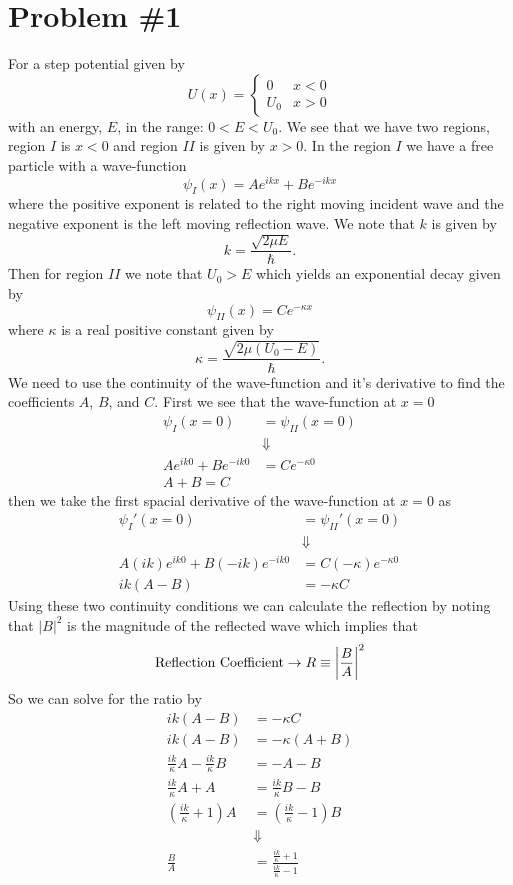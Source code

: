 \documentclass[11pt]{article}
\numberwithin{equation}{section}
\begin{document}


\section{Problem \#1}
For a step potential given by
$$U(x) = \left\{\begin{array}{cl}
                  0      &x<0\\
                  U_0    &x>0
         \end{array}\right.$$
with an energy, $E$, in the range: $0<E<U_0$. We see that we have two regions, region $I$ is
$x<0$ and region $II$ is given by $x>0$. In the region $I$ we have a free particle with a 
wave-function 
$$\psi_I(x) = Ae^{ikx} + Be^{-ikx}$$
where the positive exponent is related to the right moving incident wave and the negative 
exponent is the left moving reflection wave. We note that $k$ is given by
$$k = \frac{\sqrt{2\mu E}}{\hbar}.$$
Then for region $II$ we note that $U_0>E$ which
yields an exponential decay given by
$$\psi_{II}(x) = Ce^{-\kappa x}$$
where $\kappa$ is a real positive constant given by
$$\kappa = \frac{\sqrt{2\mu(U_0-E)}}{\hbar}.$$
We need to use the continuity of the wave-function and it's derivative to find the 
coefficients $A$, $B$, and $C$. First we see that the wave-function at $x=0$ 
\begin{align*}
\psi_I(x=0) &= \psi_{II}(x=0)\\
&\Downarrow\\
Ae^{ik0} + Be^{-ik0} &= Ce^{-\kappa 0}\\
A + B = C
\end{align*}
then we take the first spacial derivative of the wave-function at $x=0$ as
\begin{align*}
\psi_I'(x=0) &= \psi_{II}'(x=0)\\
&\Downarrow\\
A(ik)e^{ik0} + B(-ik)e^{-ik0} &= C(-\kappa)e^{-\kappa 0}\\
ik(A - B) &= -\kappa C
\end{align*}
Using these two continuity conditions we can calculate the reflection by noting that $|B|^2$
is the magnitude of the reflected wave which implies that
$$\textnormal{Reflection Coefficient}\rightarrow R\equiv\left|\frac{B}{A}\right|^2$$
So we can solve for the ratio by
\begin{align*}
ik(A - B) &= -\kappa C\\
ik(A - B) &= -\kappa (A+B)\\
\frac{ik}{\kappa}A - \frac{ik}{\kappa}B &= -A - B\\
\frac{ik}{\kappa}A  + A &= \frac{ik}{\kappa}B- B\\
\left(\frac{ik}{\kappa}+1\right)A&= \left(\frac{ik}{\kappa}-1\right) B\\
&\Downarrow\\
\frac{B}{A} &= \frac{\frac{ik}{\kappa}+1}{\frac{ik}{\kappa}-1}
\end{align*}
\end{document}
